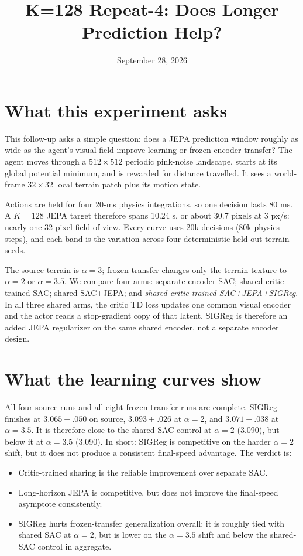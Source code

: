 \documentclass[10pt]{article}
\title{K=128 Repeat-4: Does Longer Prediction Help?}
\date{September 28, 2026}
\begin{document}
\maketitle

\section{What this experiment asks}
This follow-up asks a simple question: does a JEPA prediction window roughly
as wide as the agent's visual field improve learning or frozen-encoder
transfer? The agent moves through a $512\times512$ periodic pink-noise
landscape, starts at its global potential minimum, and is rewarded for
distance travelled. It sees a world-frame $32\times32$ local terrain patch
plus its motion state.

Actions are held for four 20-ms physics integrations, so one decision lasts
80 ms. A $K=128$ JEPA target therefore spans 10.24 s, or about 30.7 pixels at
3 px/s: nearly one 32-pixel field of view. Every curve uses 20k decisions
(80k physics steps), and each band is the variation across four deterministic
held-out terrain seeds.

The source terrain is $\alpha=3$; frozen transfer changes only the terrain
texture to $\alpha=2$ or $\alpha=3.5$. We compare four arms: separate-encoder
SAC; shared critic-trained SAC; shared SAC+JEPA; and \emph{shared
critic-trained SAC+JEPA+SIGReg}. In all three shared arms, the critic TD loss
updates one common visual encoder and the actor reads a stop-gradient copy of
that latent. SIGReg is therefore an added JEPA regularizer on the same shared
encoder, not a separate encoder design.

\section{What the learning curves show}
All four source runs and all eight frozen-transfer runs are complete. SIGReg
finishes at $3.065\pm.050$ on source, $3.093\pm.026$ at $\alpha=2$, and
$3.071\pm.038$ at $\alpha=3.5$. It is therefore close to the shared-SAC
control at $\alpha=2$ (3.090), but below it at $\alpha=3.5$ (3.090). In
short: SIGReg is competitive on the harder $\alpha=2$ shift, but it does not
produce a consistent final-speed advantage. The verdict is:
\begin{itemize}
\item Critic-trained sharing is the reliable improvement over separate SAC.
\item Long-horizon JEPA is competitive, but does not improve the final-speed
      asymptote consistently.
\item SIGReg hurts frozen-transfer generalization overall: it is roughly tied
      with shared SAC at $\alpha=2$, but is lower on the $\alpha=3.5$ shift
      and below the shared-SAC control in aggregate.
\end{itemize}
\end{document}
